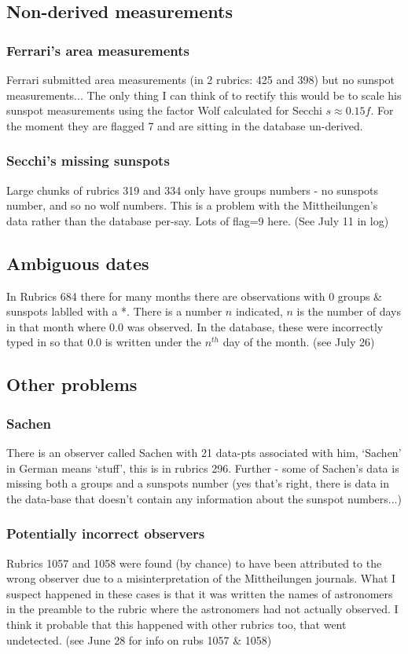 \documentclass[12pt]{article}
\begin{document}
\subsection{Non-derived measurements}
\subsubsection{Ferrari's area measurements}
Ferrari submitted area measurements (in 2 rubrics: 425 and 398) but no sunspot measurements... The only thing I can think of to rectify this would be to scale his sunspot measurements using the factor Wolf calculated for Secchi $s \approx 0.15 f$. For the moment they are flagged 7 and are sitting in the database un-derived.

\subsubsection{Secchi's missing sunspots}
Large chunks of rubrics 319 and 334 only have groups numbers - no sunspots number, and so no wolf numbers. This is a problem with the Mittheilungen's data rather than the database per-say. Lots of flag=9 here. (See July 11 in log)

\subsection{Ambiguous dates}
In Rubrics 684 there for many months there are observations with 0 groups \& sunspots lablled with a *. There is a number $n$ indicated, $n$ is the number of days in that month where $0.0$ was observed. In the database, these were incorrectly typed in so that 0.0 is written under the $n^{th}$ day of the month. (see July 26)

\subsection{Other problems}
\subsubsection{Sachen}
There is an observer called Sachen with 21 data-pts associated with him, `Sachen' in German means `stuff', this is in rubrics 296. Further - some of Sachen's data is missing both a groups and a sunspots number (yes that's right, there is data in the data-base that doesn't contain any information about the sunspot numbers...) 

\subsubsection{Potentially incorrect observers}
Rubrics 1057 and 1058 were found (by chance) to have been attributed to the wrong observer due to a misinterpretation of the Mittheilungen journals. What I suspect happened in these cases is that it was written the names of astronomers in the preamble to the rubric where the astronomers had not actually observed. I think it probable that this happened with other rubrics too, that went undetected. (see June 28 for info on rubs 1057 \& 1058)
\end{document}
